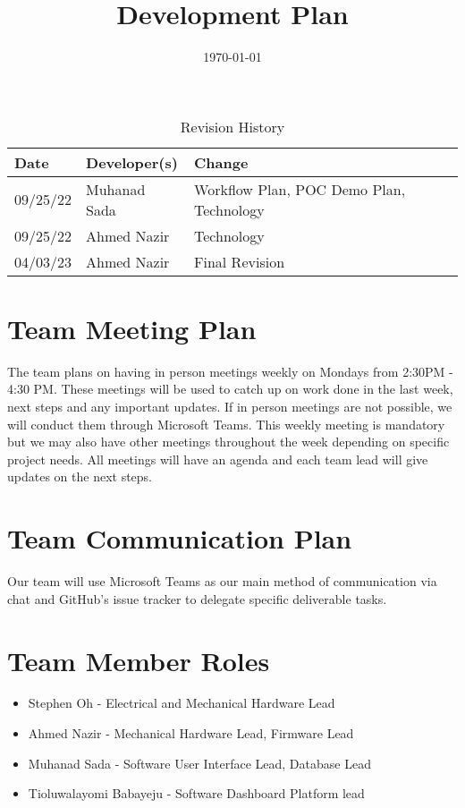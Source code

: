 \documentclass[12pt]{article}
\date{}
\begin{document}
\title{Development Plan\\\progname}

\author{\authname}
\date{\today}

\maketitle
\newpage

\begin{table}[hp]
\caption{Revision History} \label{TblRevisionHistory}
\begin{tabularx}{\textwidth}{llX}
\toprule
\textbf{Date} & \textbf{Developer(s)} & \textbf{Change}\\
\midrule
09/25/22 & Muhanad Sada & Workflow Plan, POC Demo Plan, Technology\\
09/25/22 & Ahmed Nazir & Technology\\
04/03/23 & Ahmed Nazir & Final Revision\\
\bottomrule
\end{tabularx}
\end{table}

\newpage
\tableofcontents
\listoftables

\newpage




\section{Team Meeting Plan}
The team plans on having in person meetings weekly on Mondays from 2:30PM - 4:30 PM. These meetings will be used to catch up on work done in the last week, next steps and any important updates. If in person meetings are not possible, we will conduct them through Microsoft Teams. This weekly meeting is mandatory but we may also have other meetings throughout the week depending on specific project needs. All meetings will have an agenda and each team lead will give updates on the next steps. 

\section{Team Communication Plan}
Our team will use Microsoft Teams as our main method of communication via chat and GitHub's issue tracker to delegate specific deliverable tasks.

\section{Team Member Roles}
\begin{itemize}
	\item Stephen Oh - Electrical and Mechanical Hardware Lead
	\item Ahmed Nazir - Mechanical Hardware Lead, Firmware Lead
	\item Muhanad Sada - Software User Interface Lead, Database Lead
	\item Tioluwalayomi Babayeju - Software Dashboard Platform lead
\end{itemize}
\end{document}

